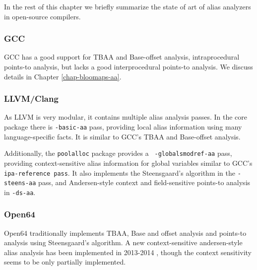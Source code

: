 In the rest of this chapter we briefly summarize the state of art of alias
analyzers in open-source compilers.

\subsubsection{GCC}

GCC has a good support for TBAA and Base-offset analysis, intraprocedural
points-to analysis, but lacks a good interprocedural points-to analysis. We
discuss details in Chapter \ref{chap-bloomaps-aa}.

\subsubsection{LLVM/Clang}

As LLVM is very modular, it contains multiple alias analysis passes. In the core
package there is {\tt -basic-aa} pass, providing local alias information using
many language-specific facts. It is similar to GCC's TBAA and Base-offset
analysis.

Additionally, the {\tt poolalloc} package provides a {\tt
-globalsmodref-aa} pass, providing context-sensitive alias information for
global variables similar to GCC's {\tt ipa-reference pass}. It also implements
the Steensgaard's algorithm in the {\tt -steens-aa} pass, and Andersen-style
context and field-sensitive points-to analysis in {\tt -ds-aa}.

\subsubsection{Open64}

Open64 traditionally implements TBAA, Base and offset analysis and points-to
analysis using
Steensgaard's algorithm.  A new context-sensitive andersen-style alias analysis has been implemented in
2013-2014 \cite{sui2014}, though the context sensitivity seems to be only
partially implemented.

